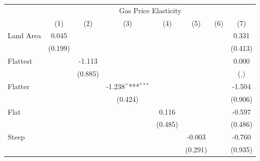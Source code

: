 {
\def\sym#1{\ifmmode^{#1}\else\(^{#1}\)\fi}
\begin{tabular}{l*{7}{c}}
\hline\hline
            &\multicolumn{7}{c}{Gas Price Elasticity}                                                                                                                 \\
            &\multicolumn{1}{c}{(1)}         &\multicolumn{1}{c}{(2)}         &\multicolumn{1}{c}{(3)}         &\multicolumn{1}{c}{(4)}         &\multicolumn{1}{c}{(5)}         &\multicolumn{1}{c}{(6)}         &\multicolumn{1}{c}{(7)}         \\
\hline
Land Area   &       0.045         &                     &                     &                     &                     &                     &       0.331         \\
            &     (0.199)         &                     &                     &                     &                     &                     &     (0.413)         \\
[1em]
Flattest    &                     &      -1.113         &                     &                     &                     &                     &       0.000         \\
            &                     &     (0.885)         &                     &                     &                     &                     &         (.)         \\
[1em]
Flatter     &                     &                     &      -1.238\sym{***}&                     &                     &                     &      -1.504         \\
            &                     &                     &     (0.424)         &                     &                     &                     &     (0.906)         \\
[1em]
Flat        &                     &                     &                     &       0.116         &                     &                     &      -0.597         \\
            &                     &                     &                     &     (0.485)         &                     &                     &     (0.486)         \\
[1em]
Steep       &                     &                     &                     &                     &      -0.003         &                     &      -0.760         \\
            &                     &                     &                     &                     &     (0.291)         &                     &     (0.935)         \\

\end{tabular}}
